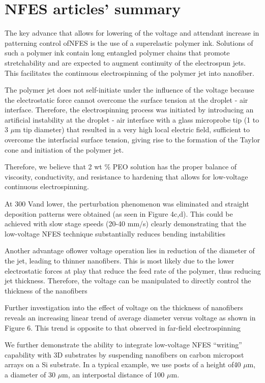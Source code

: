 \documentclass[3p,,preprint,12pt]{elsarticle}
\begin{document}
    
\section{NFES articles' summary}
The key advance that allows for lowering of the voltage and attendant increase in patterning control ofNFES is the use of a superelastic polymer ink. Solutions of such a polymer ink contain long entangled polymer chains that promote stretchability and are expected to augment continuity of the electrospun jets. This facilitates the continuous electrospinning of the polymer jet into nanofiber. 

The polymer jet does not self-initiate under the influence of the voltage because the electrostatic force cannot overcome the surface tension at the droplet - air interface. Therefore, the electrospinning process was initiated by introducing an artificial instability at the droplet - air interface with a glass microprobe tip (1 to 3 \ensuremath{\mu }m tip diameter) that resulted in a very high local electric field, sufficient to overcome the interfacial surface tension, giving rise to the formation of the Taylor cone and initiation of the polymer jet.

Therefore, we believe that 2 wt \% PEO solution has the proper balance of viscosity, conductivity, and resistance to hardening that allows for low-voltage continuous electrospinning.

At 300 Vand lower, the perturbation phenomenon was eliminated and straight deposition patterns were obtained (as seen in Figure 4c,d). This could be achieved with slow stage speeds (20-40 mm/s) clearly demonstrating that the low-voltage NFES technique substantially reduces bending instabilities

Another advantage oflower voltage operation lies in reduction of the diameter of the jet, leading to thinner nanofibers. This is most likely due to the lower electrostatic forces at play that reduce the feed rate of the polymer, thus reducing jet thickness. Therefore, the voltage can be manipulated to directly control the thickness of the nanofibers

Further investigation into the effect of voltage on the thickness \mbox{}\protect\newline of nanofibers reveals an increasing linear trend of average diameter versus voltage as shown in Figure 6. This trend is opposite to that observed in far-field electrospinning

We further demonstrate the ability to integrate low-voltage \mbox{}\protect\newline NFES ``writing'' capability with 3D substrates by suspending nanofibers on carbon micropost arrays on a Si substrate. In a typical example, we use posts of a height of40 \ensuremath{\mu }m, a diameter of 30 \ensuremath{\mu }m, an interpostal distance of 100 \ensuremath{\mu }m. \unskip~\cite{527120:11973130}
\end{document}
